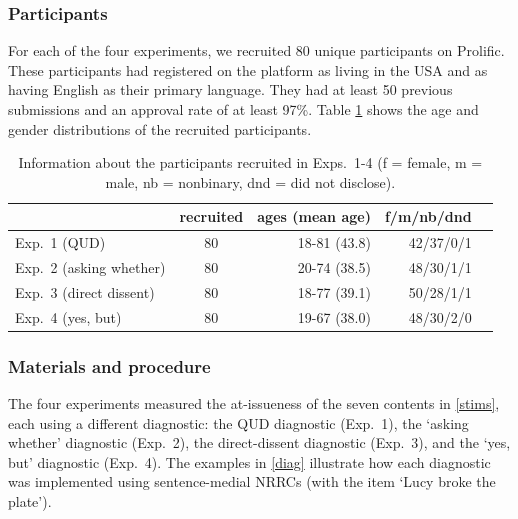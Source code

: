 \documentclass[times,linguex,xcolor]{glossa}
\begin{document}
    \subsubsection{Participants}

      For each of the four experiments, we recruited 80 unique participants on Prolific. These participants had registered on the platform as living in the USA and as having English as their primary language. They had at least 50 previous submissions and an approval rate of at least 97\%.  Table \ref{t:recruited} shows the age and gender distributions of the recruited participants.

      \begin{table}[h!]
      \centering
      \begin{tabular}{l | c | r r r }
                  & recruited & ages (mean age) & f/m/nb/dnd \\ \hline
      Exp.~1 (QUD) & 80 & 18-81 (43.8) & 42/37/0/1  \\
      Exp.~2 (asking whether) & 80 & 20-74 (38.5)  & 48/30/1/1  \\
      Exp.~3 (direct dissent) & 80 & 18-77 (39.1) & 50/28/1/1  \\
      Exp.~4 (yes, but) &80 & 19-67 (38.0)  & 48/30/2/0 &  \\
      \hline
      \end{tabular}

      \caption{Information about the participants recruited in Exps.~1-4 (f = female, m = male, nb = nonbinary, dnd = did not disclose).}\label{t:recruited}
      \end{table}

    \subsubsection{Materials and procedure}
      
      The four experiments measured the at-issueness of the seven contents in \ref{stims}, each using a different diagnostic: the QUD diagnostic (Exp.~1), the `asking whether' diagnostic (Exp.~2), the direct-dissent diagnostic (Exp.~3), and the `yes, but' diagnostic (Exp.~4). The examples in \ref{diag} illustrate how each diagnostic was implemented using sentence-medial NRRCs (with the item `Lucy broke the plate').
\end{document}
